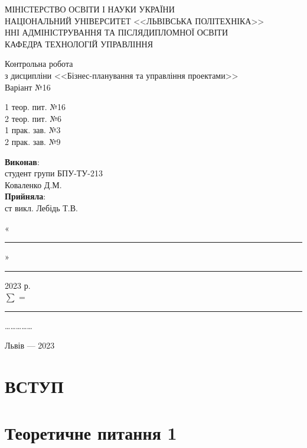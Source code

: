 \documentclass[oneside,14pt]{extarticle}
\begin{document}
\begin{titlepage}
	\begin{center}
МІНІСТЕРСТВО ОСВІТИ І НАУКИ УКРАЇНИ\\
НАЦІОНАЛЬНИЙ УНІВЕРСИТЕТ <<ЛЬВІВСЬКА ПОЛІТЕХНІКА>>\\
ННІ АДМІНІСТРУВАННЯ ТА ПІСЛЯДИПЛОМНОЇ ОСВІТИ\\
КАФЕДРА ТЕХНОЛОГІЙ УПРАВЛІННЯ

		
		\vspace{80pt}
Контрольна робота\\
з дисципліни <<Бізнес-планування та управління проектами>>\\
Варіант №16
\begin{flushleft}
	1 теор. пит. №16\\
	2 теор. пит. №6\\
	1 прак. зав. №3\\
	2 прак. зав. №9\\
\end{flushleft}
		\vspace*{20pt}
		
		\begin{flushright}
			\textbf{Виконав}:\\
			
			студент групи БПУ-ТУ-213\\
			Коваленко Д.М.\\
			\vspace{10pt}
			\textbf{Прийняла}:\\
			ст викл. Лебідь Т.В.
			
			\vspace{28pt}
			«\rule{1cm}{0.15mm}» \rule{1.5cm}{0.15mm} 2023 р.\\
			$\sum$ = \rule{1cm}{0.15mm}……………\\
			
		\end{flushright}
		\vspace{\fill}
		Львів — 2023
	\end{center}
\end{titlepage}
\setcounter{page}{2}
\tableofcontents
\newpage

\section*{ВСТУП}

\newpage
\section*{Теоретичне питання 1}
\end{document}
